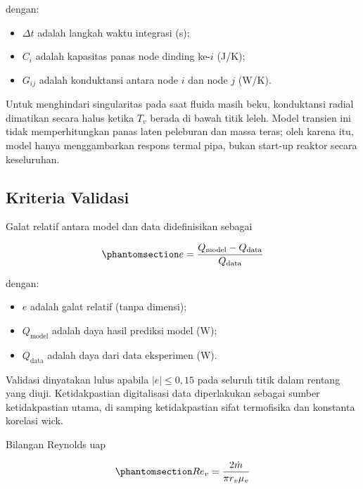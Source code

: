 \documentclass[
  indonesian,
  12pt,
  a4paper,
]{report}
\providecommand{\tightlist}{%
  \setlength{\itemsep}{0pt}\setlength{\parskip}{0pt}}
\begin{document}
dengan:

\begin{itemize}
\tightlist
\item
  \(\Delta t\) adalah langkah waktu integrasi (s);
\item
  \(C_i\) adalah kapasitas panas node dinding ke-\(i\) (J/K);
\item
  \(G_{ij}\) adalah konduktansi antara node \(i\) dan node \(j\) (W/K).
\end{itemize}

Untuk menghindari singularitas pada saat fluida masih beku, konduktansi
radial dimatikan secara halus ketika \(T_v\) berada di bawah titik
leleh. Model transien ini tidak memperhitungkan panas laten peleburan
dan massa teras; oleh karena itu, model hanya menggambarkan respons
termal pipa, bukan start-up reaktor secara keseluruhan.

\subsection{Kriteria Validasi}\label{kriteria-validasi}

Galat relatif antara model dan data didefinisikan sebagai

\begin{equation}\protect\phantomsection\label{eq-error}{ e = \frac{Q_{\mathrm{model}}-Q_{\mathrm{data}}}{Q_{\mathrm{data}}}
   }\end{equation}

dengan:

\begin{itemize}
\tightlist
\item
  \(e\) adalah galat relatif (tanpa dimensi);
\item
  \(Q_{\mathrm{model}}\) adalah daya hasil prediksi model (W);
\item
  \(Q_{\mathrm{data}}\) adalah daya dari data eksperimen (W).
\end{itemize}

Validasi dinyatakan lulus apabila \(|e|\le 0{,}15\) pada seluruh titik
dalam rentang yang diuji. Ketidakpastian digitalisasi data diperlakukan
sebagai sumber ketidakpastian utama, di samping ketidakpastian sifat
termofisika dan konstanta korelasi wick.

Bilangan Reynolds uap

\begin{equation}\protect\phantomsection\label{eq-re}{ Re_v = \frac{2\dot{m}}{\pi r_v\mu_v} }\end{equation}
\end{document}
